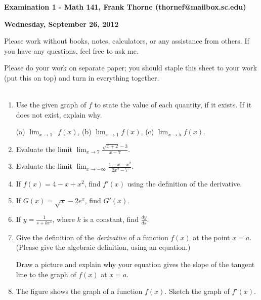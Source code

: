 \documentclass[12pt]{article}
\begin{document}
\setlength{\topmargin}{-2mm}





\begin{center}{\bf Examination 1 - Math 141, Frank Thorne (thornef@mailbox.sc.edu)}
\end{center}
\begin{center}
{\bf Wednesday, September 26, 2012}
\end{center}

Please work without books, notes, calculators, or any assistance from others. If you have
any questions, feel free to ask me. 

Please do your work on separate paper; you should staple this sheet to your work (put this on top)
and turn in everything together. 
\\
\\
\begin{enumerate}[(1)]
\item
Use the given graph of $f$ to state the value of each quantity, if it exists.
If it does not exist, explain why.

(a) $\lim_{x \rightarrow 1^-} f(x)$, (b) $\lim_{x \rightarrow 1} f(x)$, (c) $\lim_{x \rightarrow 5} f(x)$.

\item
Evaluate the limit $\lim_{x \rightarrow 7} \frac{ \sqrt{x + 2} - 3}{x - 7}.$
\item
Evaluate the limit $\lim_{x \rightarrow - \infty} \frac{1 - x - x^2}{2 x^2 - 7}$.

\item
If $f(x) = 4 - x + x^2$, find $f'(x)$ using the definition of the derivative.

\item
If $G(x) = \sqrt{x} - 2 e^x$, find $G'(x)$.

\item
If $y = \frac{1}{s + k e^s}$, where $k$ is a constant, find $\frac{dy}{ds}$.

\item
Give the definition of the {\itshape derivative} of a function
$f(x)$ at the point $x = a$. (Please give the algebraic definition,
using an equation.)

Draw a picture and explain why your
equation gives the slope of the tangent line to the graph of $f(x)$
at $x = a$.

\item
The figure shows the graph of a function $f(x)$. Sketch the graph of $f'(x)$.

\end{enumerate}
\end{document}
